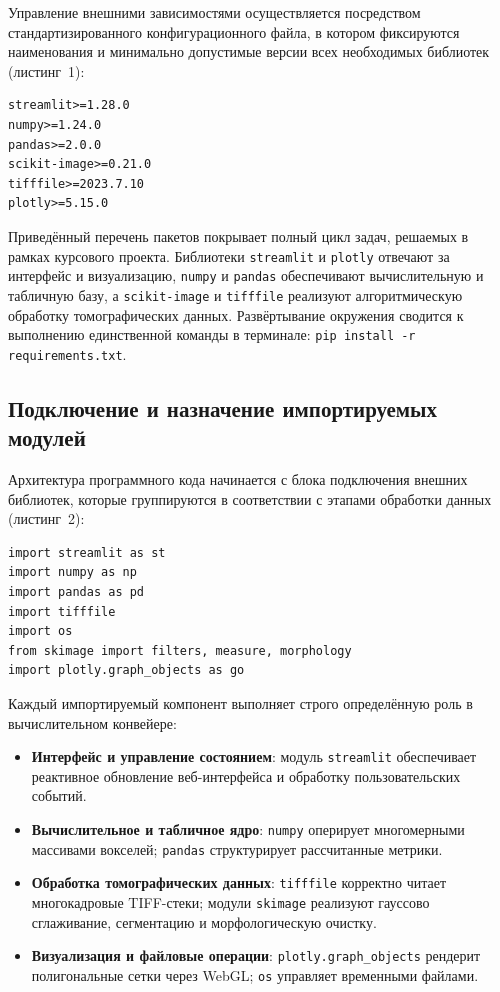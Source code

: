 \documentclass[14pt,a4paper]{extreport}
\begin{document}
Управление внешними зависимостями осуществляется посредством стандартизированного конфигурационного файла, в котором фиксируются наименования и минимально допустимые версии всех необходимых библиотек (листинг~1):

\begin{lstlisting}[caption={Конфигурационный файл внешних зависимостей проекта}]
streamlit>=1.28.0
numpy>=1.24.0
pandas>=2.0.0
scikit-image>=0.21.0
tifffile>=2023.7.10
plotly>=5.15.0
\end{lstlisting}

Приведённый перечень пакетов покрывает полный цикл задач, решаемых в рамках курсового проекта. Библиотеки \texttt{streamlit} и \texttt{plotly} отвечают за интерфейс и визуализацию, \texttt{numpy} и \texttt{pandas} обеспечивают вычислительную и табличную базу, а \texttt{scikit-image} и \texttt{tifffile} реализуют алгоритмическую обработку томографических данных. Развёртывание окружения сводится к выполнению единственной команды в терминале: \texttt{pip install -r requirements.txt}.

\subsection{Подключение и назначение импортируемых модулей}

Архитектура программного кода начинается с блока подключения внешних библиотек, которые группируются в соответствии с этапами обработки данных (листинг~2):

\begin{lstlisting}[caption={Блок подключения программных модулей и библиотек}]
import streamlit as st
import numpy as np
import pandas as pd
import tifffile
import os
from skimage import filters, measure, morphology
import plotly.graph_objects as go
\end{lstlisting}

Каждый импортируемый компонент выполняет строго определённую роль в вычислительном конвейере:
\begin{itemize}
  \item \textbf{Интерфейс и управление состоянием}: модуль \texttt{streamlit} обеспечивает реактивное обновление веб-интерфейса и обработку пользовательских событий.
  \item \textbf{Вычислительное и табличное ядро}: \texttt{numpy} оперирует многомерными массивами вокселей; \texttt{pandas} структурирует рассчитанные метрики.
  \item \textbf{Обработка томографических данных}: \texttt{tifffile} корректно читает многокадровые TIFF-стеки; модули \texttt{skimage} реализуют гауссово сглаживание, сегментацию и морфологическую очистку.
  \item \textbf{Визуализация и файловые операции}: \texttt{plotly.graph\_objects} рендерит полигональные сетки через WebGL; \texttt{os} управляет временными файлами.
\end{itemize}
\end{document}

